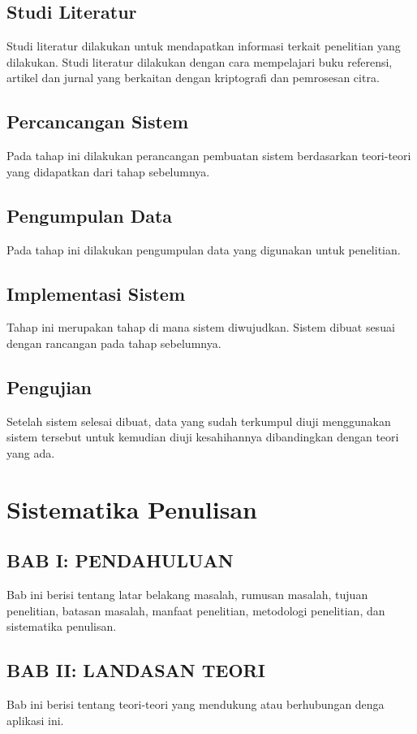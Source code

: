 \subsection{Studi Literatur}
Studi literatur dilakukan untuk mendapatkan informasi terkait penelitian yang
dilakukan. Studi literatur dilakukan dengan cara mempelajari buku referensi, artikel
dan jurnal yang berkaitan dengan kriptografi dan pemrosesan citra.

\subsection{Percancangan Sistem}
Pada tahap ini dilakukan perancangan pembuatan sistem berdasarkan teori-teori yang didapatkan 
dari tahap sebelumnya.

\subsection{Pengumpulan Data}
Pada tahap ini dilakukan pengumpulan data yang digunakan untuk penelitian.

\subsection{Implementasi Sistem}
Tahap ini merupakan tahap di mana sistem diwujudkan. Sistem dibuat sesuai dengan rancangan 
pada tahap sebelumnya.

\subsection{Pengujian}
Setelah sistem selesai dibuat, data yang sudah terkumpul diuji menggunakan sistem tersebut
untuk kemudian diuji kesahihannya dibandingkan dengan teori yang ada.

\section{Sistematika Penulisan}
\subsection*{BAB I: PENDAHULUAN} %
\begin{addmargin}[0.75cm]{0em}
Bab ini berisi tentang latar belakang masalah, rumusan masalah, tujuan penelitian, batasan masalah, manfaat penelitian, metodologi penelitian, dan sistematika penulisan.
\end{addmargin}
\subsection*{BAB II: LANDASAN TEORI}
\begin{addmargin}[0.75cm]{0em}
Bab ini berisi tentang teori-teori yang mendukung atau berhubungan denga aplikasi ini.
\end{addmargin}
